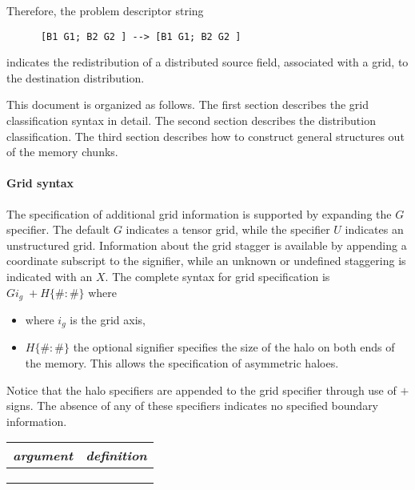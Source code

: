Therefore, the problem descriptor string
\begin{center}
\begin{verbatim}
      [B1 G1; B2 G2 ] --> [B1 G1; B2 G2 ]
\end{verbatim}
\end{center}
indicates the redistribution of a distributed source field, associated with a grid, to the destination distribution. 

This document is organized as follows. The first section describes the grid classification syntax in detail. The second section describes the distribution classification. The third section describes how to construct general structures out of the memory chunks. 

\paragraph{Grid syntax}
The specification of additional grid information is supported by expanding the $G$ specifier. The default $G$ indicates a tensor grid, while the specifier $U$ indicates an unstructured grid. Information about the grid stagger is available by appending a coordinate subscript to the signifier, while an unknown or undefined staggering is indicated with an $X$.
The complete syntax for grid specification is $G i_g \; + H \{ \# : \# \}$ where
\begin{itemize}
	\item where $i_g$ is the grid axis,
	\item $H \{ \# : \# \}$ the optional signifier specifies the size of the  halo on both ends of the memory. This allows the specification of asymmetric haloes.
\end{itemize}

Notice that the halo specifiers are appended to the grid specifier through use of $+$ signs. The absence of any of these specifiers indicates no specified boundary information.
\begin{center}
\begin{tabular}{| c | c |} \hline \hline
{\em argument } & {\em definition} \\
\hline
 &   \\
 &  \\
 &  \\
\hline 
\end{tabular}
\end{center}

